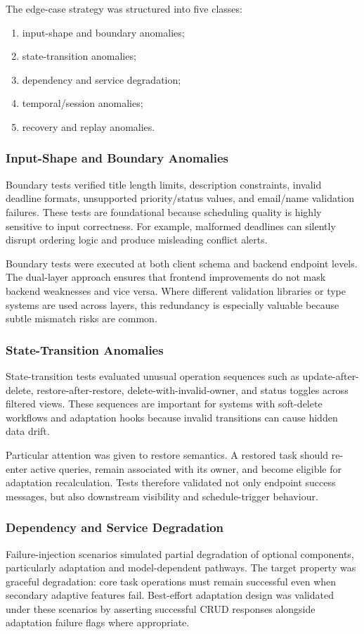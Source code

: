 \documentclass[12pt]{article}
\begin{document}
The edge-case strategy was structured into five classes:
\begin{enumerate}
    \item input-shape and boundary anomalies;
    \item state-transition anomalies;
    \item dependency and service degradation;
    \item temporal/session anomalies;
    \item recovery and replay anomalies.
\end{enumerate}

\subsubsection{Input-Shape and Boundary Anomalies}
Boundary tests verified title length limits, description constraints, invalid deadline formats, unsupported priority/status values, and email/name validation failures. These tests are foundational because scheduling quality is highly sensitive to input correctness. For example, malformed deadlines can silently disrupt ordering logic and produce misleading conflict alerts.

Boundary tests were executed at both client schema and backend endpoint levels. The dual-layer approach ensures that frontend improvements do not mask backend weaknesses and vice versa. Where different validation libraries or type systems are used across layers, this redundancy is especially valuable because subtle mismatch risks are common.

\subsubsection{State-Transition Anomalies}
State-transition tests evaluated unusual operation sequences such as update-after-delete, restore-after-restore, delete-with-invalid-owner, and status toggles across filtered views. These sequences are important for systems with soft-delete workflows and adaptation hooks because invalid transitions can cause hidden data drift.

Particular attention was given to restore semantics. A restored task should re-enter active queries, remain associated with its owner, and become eligible for adaptation recalculation. Tests therefore validated not only endpoint success messages, but also downstream visibility and schedule-trigger behaviour.

\subsubsection{Dependency and Service Degradation}
Failure-injection scenarios simulated partial degradation of optional components, particularly adaptation and model-dependent pathways. The target property was graceful degradation: core task operations must remain successful even when secondary adaptive features fail. Best-effort adaptation design was validated under these scenarios by asserting successful CRUD responses alongside adaptation failure flags where appropriate.
\end{document}
